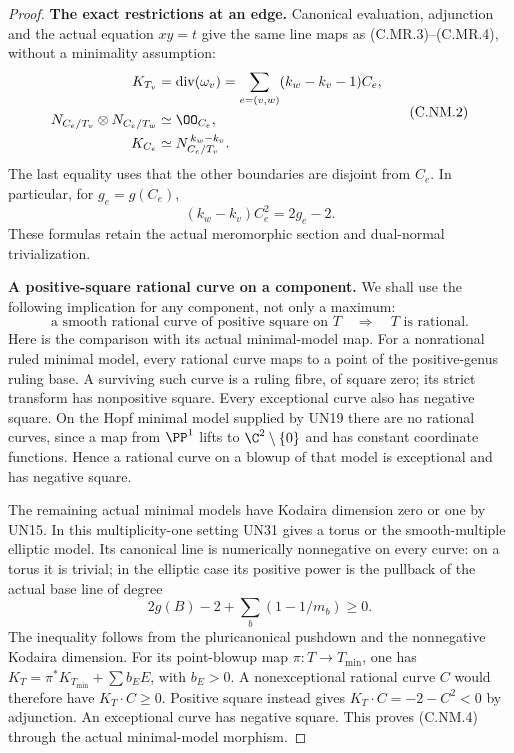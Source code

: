 \begin{proof}
\par\medskip\noindent\textbf{The exact restrictions at an edge.}
Canonical evaluation, adjunction and the actual equation $xy=t$
give the same line maps as (C.MR.3)--(C.MR.4), without a
minimality assumption:
\[
 \begin{split}
 K_{T_v}&=\operatorname{div}(\omega_v)
       =\sum_{e=(v,w)}(k_w-k_v-1)C_e,\\
 N_{C_e/T_v}\otimes N_{C_e/T_w}&\simeq\OO_{C_e},\\
 K_{C_e}&\simeq N_{C_e/T_v}^{\,k_w-k_v}.
 \end{split}
\tag{C.NM.2}
\]
The last equality uses that the other boundaries are disjoint
from $C_e$. In particular, for $g_e=g(C_e)$,
\[
                  (k_w-k_v)C_e^2=2g_e-2.
\tag{C.NM.3}
\]
These formulas retain the actual meromorphic section and
dual-normal trivialization.

\par\medskip\noindent\textbf{A positive-square rational curve on a component.}
We shall use the following implication for any component, not
only a maximum:
\[
 \text{a smooth rational curve of positive square on }T
                         \quad\Longrightarrow\quad T
                         \text{ is rational}.
\tag{C.NM.4}
\]
Here is the comparison with its actual minimal-model map.
For a nonrational ruled minimal model, every rational curve
maps to a point of the positive-genus ruling base. A surviving
such curve is a ruling fibre, of square zero; its strict
transform has nonpositive square. Every exceptional curve
also has negative square. On the Hopf minimal model supplied
by UN19 there are no rational curves, since a map from
$\PP^1$ lifts to $\C^2\setminus\{0\}$ and has constant
coordinate functions. Hence a rational curve on a blowup of
that model is exceptional and has negative square.

The remaining actual minimal models have Kodaira dimension
zero or one by UN15. In this multiplicity-one setting UN31
gives a torus or the smooth-multiple elliptic model. Its
canonical line is numerically nonnegative on every curve:
on a torus it is trivial; in the elliptic case its positive
power is the pullback of the actual base line of degree
\[
                   2g(B)-2+\sum_b(1-1/m_b)\ge0.
\tag{C.NM.5}
\]
The inequality follows from the pluricanonical pushdown and
the nonnegative Kodaira dimension. For its point-blowup map
$\pi:T\to T_{\min}$, one has
$K_T=\pi^*K_{T_{\min}}+\sum b_EE$, with $b_E>0$.
A nonexceptional rational curve $C$ would therefore have
$K_T\cdot C\ge0$. Positive square instead gives
$K_T\cdot C=-2-C^2<0$ by adjunction. An exceptional curve
has negative square. This proves (C.NM.4) through the
actual minimal-model morphism.


\end{proof}
